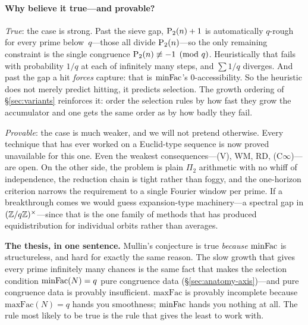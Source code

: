 \paragraph{Why believe it true---and provable?}
\emph{True}: the case is strong.  Past the sieve gap, $\mathrm{P}_{2}(n)+1$ is
automatically $q$-rough for every prime below~$q$---those all divide
$\mathrm{P}_{2}(n)$---so the only remaining constraint is the single congruence
$\mathrm{P}_{2}(n) \not\equiv -1 \pmod q$.  Heuristically that fails with
probability $1/q$ at each of infinitely many steps, and $\sum 1/q$
diverges.  And past the gap a hit \emph{forces} capture: that is
$\mathrm{minFac}$'s $0$-accessibility.  So the heuristic does not merely predict
hitting, it predicts selection.  The growth ordering of
\S\ref{sec:variants} reinforces it: order the selection rules by how fast
they grow the accumulator and one gets the same order as by how badly
they fail.

\emph{Provable}: the case is much weaker, and we will not pretend
otherwise.  Every technique that has ever worked on a Euclid-type
sequence is now proved unavailable for this one.  Even the weakest
consequences---(V), WM, RD, (C$\infty$)---are open.  On the other side,
the problem is plain $\Pi_2$ arithmetic with no whiff of independence,
the reduction chain is tight rather than foggy, and the one-horizon
criterion narrows the requirement to a single Fourier window per prime.
If a breakthrough comes we would guess expansion-type machinery---a
spectral gap in $(\mathbb{Z}/q\mathbb{Z})^\times$---since that is the one family of
methods that has produced equidistribution for individual orbits rather
than averages.

\begin{frontierbox}
\textbf{The thesis, in one sentence.}
Mullin's conjecture is true \emph{because} $\mathrm{minFac}$ is structureless,
and hard for exactly the same reason.  The slow growth that gives every
prime infinitely many chances is the same fact that makes the selection
condition $\mathrm{minFac}(N) = q$ pure congruence data
(\S\ref{sec:anatomy-axis})---and pure congruence data is provably
insufficient.  $\mathrm{maxFac}$ is provably incomplete because
$\mathrm{maxFac}(N) = q$ hands you smoothness; $\mathrm{minFac}$ hands you
nothing at all.  The rule most likely to be true is the rule that gives
the least to work with.
\end{frontierbox}
